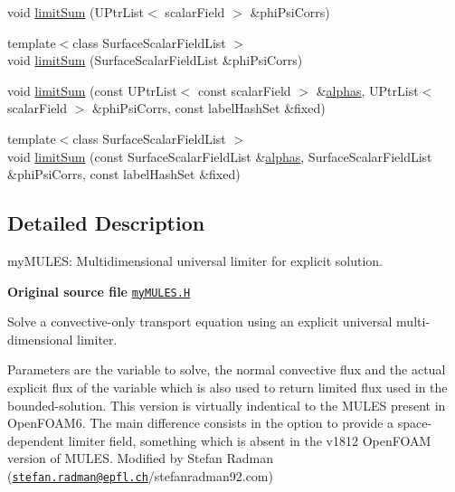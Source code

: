 \begin{DoxyCompactItemize}
\item 
void \hyperlink{namespaceFoam_1_1myMULES_aaae3018ee0507861d4bc922ead356165}{limit\+Sum} (U\+Ptr\+List$<$ scalar\+Field $>$ \&phi\+Psi\+Corrs)
\item 
{\footnotesize template$<$class Surface\+Scalar\+Field\+List $>$ }\\void \hyperlink{namespaceFoam_1_1myMULES_a2a6599c8010c73aee2d272c630310a15}{limit\+Sum} (Surface\+Scalar\+Field\+List \&phi\+Psi\+Corrs)
\item 
void \hyperlink{namespaceFoam_1_1myMULES_a108da011c64c47c3247e56b83467ac34}{limit\+Sum} (const U\+Ptr\+List$<$ const scalar\+Field $>$ \&\hyperlink{alphaEqns__2p_8H_a2cbad8ea5beaa4a82b823322537d5a70}{alphas}, U\+Ptr\+List$<$ scalar\+Field $>$ \&phi\+Psi\+Corrs, const label\+Hash\+Set \&fixed)
\item 
{\footnotesize template$<$class Surface\+Scalar\+Field\+List $>$ }\\void \hyperlink{namespaceFoam_1_1myMULES_a25814ac88176fe3afac0fa3eb2a1f90c}{limit\+Sum} (const Surface\+Scalar\+Field\+List \&\hyperlink{alphaEqns__2p_8H_a2cbad8ea5beaa4a82b823322537d5a70}{alphas}, Surface\+Scalar\+Field\+List \&phi\+Psi\+Corrs, const label\+Hash\+Set \&fixed)
\end{DoxyCompactItemize}


\subsection{Detailed Description}
my\+M\+U\+L\+ES\+: Multidimensional universal limiter for explicit solution. 

{\bfseries Original source file} \href{../../../home/carlo/data/GeN-Foam/GeN-Foam_ffn/GeN-Foam/GeN-Foam/classes/thermalHydraulics/solvers/twoPhase/include/alphaEqnsRoutines/myMULES/myMULES.H}{\tt my\+M\+U\+L\+E\+S.\+H}

\label{_Description}%
 Solve a convective-\/only transport equation using an explicit universal multi-\/dimensional limiter.

Parameters are the variable to solve, the normal convective flux and the actual explicit flux of the variable which is also used to return limited flux used in the bounded-\/solution. This version is virtually indentical to the M\+U\+L\+ES present in Open\+F\+O\+A\+M6. The main difference consists in the option to provide a space-\/dependent limiter field, something which is absent in the v1812 Open\+F\+O\+AM version of M\+U\+L\+ES. Modified by Stefan Radman (\href{mailto:stefan.radman@epfl.ch}{\tt stefan.\+radman@epfl.\+ch}/stefanradman92.com)

